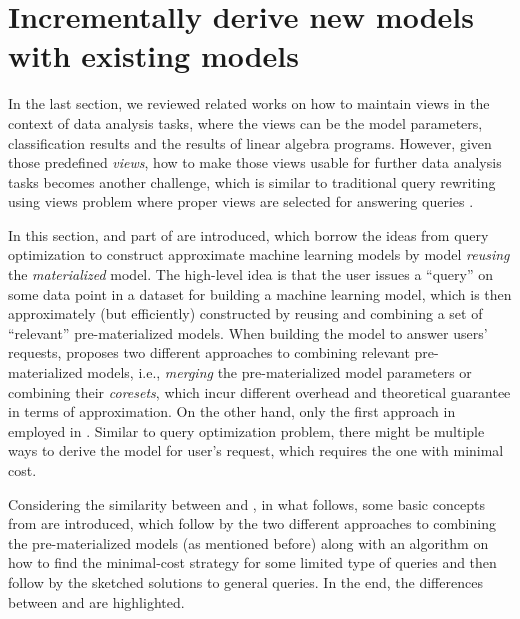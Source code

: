 \section{Incrementally derive new models with existing models}
In the last section, we reviewed related works on how to maintain views in the context of data analysis tasks, where the views can be the model parameters, classification results and the results of linear algebra programs. However, given those predefined {\em views}, how to make those views usable for further data analysis tasks becomes another challenge, which is similar to traditional query rewriting using views problem where proper views are selected for answering queries \cite{halevy2001answering}.

In this section, \cite{hasani2018efficient} and part of \cite{gupta2015processing} are introduced, which borrow the ideas from query optimization to construct approximate machine learning models by model {\em reusing} the {\em materialized} model. The high-level idea is that the user issues a ``query'' on some data point in a dataset for building a machine learning model, which is then approximately (but efficiently) constructed by reusing and combining a set of ``relevant'' pre-materialized models. When building the model to answer users' requests, \cite{hasani2018efficient} proposes two different approaches to combining relevant pre-materialized models, i.e., {\em merging} the pre-materialized model parameters or combining their {\em coresets}, which incur different overhead and theoretical guarantee in terms of approximation.  On the other hand, only the first approach in employed in \cite{gupta2015processing}. Similar to query optimization problem, there might be multiple ways to derive the model for user's request, which requires the one with minimal cost.

Considering the similarity between \cite{hasani2018efficient} and \cite{gupta2015processing}, in what follows, some basic concepts from \cite{hasani2018efficient} are introduced, which follow by the two different approaches to combining the pre-materialized models (as mentioned before) along with an algorithm on how to find the minimal-cost strategy for some limited type of queries and then follow by the sketched solutions to general queries. In the end, the differences between \cite{hasani2018efficient} and \cite{gupta2015processing} are highlighted.


